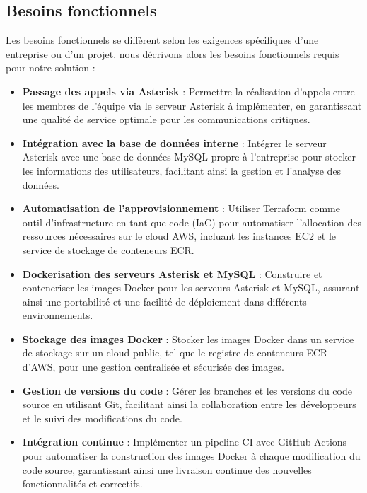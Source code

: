 \subsection{Besoins fonctionnels}
Les besoins fonctionnels se diffèrent selon les exigences spécifiques d’une entreprise ou d’un projet. nous décrivons alors les besoins fonctionnels requis pour notre solution :
\begin{itemize}
    \item \textbf{Passage des appels via Asterisk} :
    Permettre la réalisation d'appels entre les membres de l'équipe via le serveur Asterisk à implémenter, en garantissant une qualité de service optimale pour les communications critiques.

    \item \textbf{Intégration avec la base de données interne} :
    Intégrer le serveur Asterisk avec une base de données MySQL propre à l'entreprise pour stocker les informations des utilisateurs, facilitant ainsi la gestion et l'analyse des données.

    \item \textbf{Automatisation de l'approvisionnement} :
    Utiliser Terraform comme outil d'infrastructure en tant que code (IaC) pour automatiser l'allocation des ressources nécessaires sur le cloud AWS, incluant les instances EC2 et le service de stockage de conteneurs ECR.

    \item \textbf{Dockerisation des serveurs Asterisk et MySQL} :
    Construire et conteneriser les images Docker pour les serveurs Asterisk et MySQL, assurant ainsi une portabilité et une facilité de déploiement dans différents environnements.

    \item \textbf{Stockage des images Docker} :
    Stocker les images Docker dans un service de stockage sur un cloud public, tel que le registre de conteneurs ECR d'AWS, pour une gestion centralisée et sécurisée des images.

    \item \textbf{Gestion de versions du code} :
    Gérer les branches et les versions du code source en utilisant Git, facilitant ainsi la collaboration entre les développeurs et le suivi des modifications du code.

    \item \textbf{Intégration continue} :
    Implémenter un pipeline CI avec GitHub Actions pour automatiser la construction des images Docker à chaque modification du code source, garantissant ainsi une livraison continue des nouvelles fonctionnalités et correctifs.


\end{itemize}
